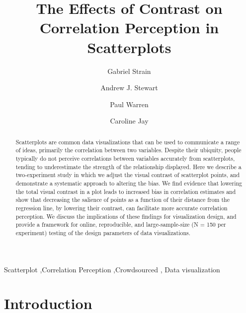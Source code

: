 \documentclass[preprint, 3p,
authoryear]{elsarticle} %
\begin{document}
\begin{frontmatter}

  \title{The Effects of Contrast on Correlation Perception in
Scatterplots}
    \author[CS]{Gabriel Strain%
  }
    \author[CS]{Andrew J. Stewart%
  }
    \author[SSS]{Paul Warren%
  }
    \author[CS]{Caroline Jay%
  }
  
  \begin{abstract}
  Scatterplots are common data visualizations that can be used to
  communicate a range of ideas, primarily the correlation between two
  variables. Despite their ubiquity, people typically do not perceive
  correlations between variables accurately from scatterplots, tending
  to underestimate the strength of the relationship displayed. Here we
  describe a two-experiment study in which we adjust the visual contrast
  of scatterplot points, and demonstrate a systematic approach to
  altering the bias. We find evidence that lowering the total visual
  contrast in a plot leads to increased bias in correlation estimates
  and show that decreasing the salience of points as a function of their
  distance from the regression line, by lowering their contrast, can
  facilitate more accurate correlation perception. We discuss the
  implications of these findings for visualization design, and provide a
  framework for online, reproducible, and large-sample-size (N = 150 per
  experiment) testing of the design parameters of data visualizations.
  \end{abstract}
    \begin{keyword}
    Scatterplot \sep Correlation Perception \sep Crowdsourced \sep 
    Data visualization
  \end{keyword}
  
 \end{frontmatter}

\hypertarget{introduction}{%
\section{Introduction}\label{introduction}}
\end{document}
